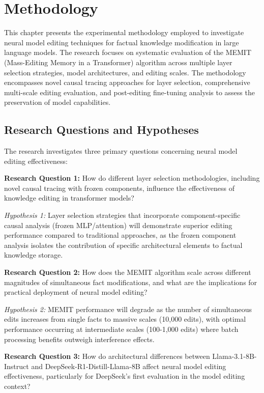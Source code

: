 \chapter{Methodology}

This chapter presents the experimental methodology employed to investigate neural model editing techniques for factual knowledge modification in large language models. The research focuses on systematic evaluation of the MEMIT (Mass-Editing Memory in a Transformer) algorithm across multiple layer selection strategies, model architectures, and editing scales. The methodology encompasses novel causal tracing approaches for layer selection, comprehensive multi-scale editing evaluation, and post-editing fine-tuning analysis to assess the preservation of model capabilities.

\section{Research Questions and Hypotheses}

The research investigates three primary questions concerning neural model editing effectiveness:

\textbf{Research Question 1:} How do different layer selection methodologies, including novel causal tracing with frozen components, influence the effectiveness of knowledge editing in transformer models?

\textit{Hypothesis 1:} Layer selection strategies that incorporate component-specific causal analysis (frozen MLP/attention) will demonstrate superior editing performance compared to traditional approaches, as the frozen component analysis isolates the contribution of specific architectural elements to factual knowledge storage.

\textbf{Research Question 2:} How does the MEMIT algorithm scale across different magnitudes of simultaneous fact modifications, and what are the implications for practical deployment of neural model editing?

\textit{Hypothesis 2:} MEMIT performance will degrade as the number of simultaneous edits increases from single facts to massive scales (10,000 edits), with optimal performance occurring at intermediate scales (100-1,000 edits) where batch processing benefits outweigh interference effects.

\textbf{Research Question 3:} How do architectural differences between Llama-3.1-8B-Instruct and DeepSeek-R1-Distill-Llama-8B affect neural model editing effectiveness, particularly for DeepSeek's first evaluation in the model editing context?

